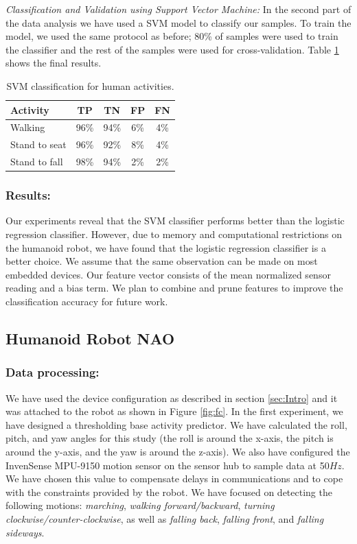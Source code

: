 \documentclass[letterpaper]{article}
\begin{document}
\noindent\emph{Classification and Validation using Support Vector Machine:}
In the second part of the data analysis we have used a SVM model
to classify our samples. To train the model, we used the same protocol as before; 80\% of
samples were used to train the classifier and the rest of the  samples were used for 
cross-validation. Table \ref{tab:human-svm-class} shows the final results.

\begin{table}[!ht]
\caption{SVM classification for human activities.}
	\label{tab:human-svm-class}
	\centering
		\begin{tabular} {|l |c |c |c|c|}
			\hline
			{\bf Activity} & {\bf  TP}  &	{\bf TN}  &	{\bf FP} &	{\bf FN} \\ 
			\hline
			Walking	& 96\%	& 94\%	& 6\%	& 4\% \\ \hline
			Stand to seat	& 96\%	& 92\%	& 8\% & 	4\%	 \\ \hline 
			Stand to fall	& 98\%	& 94\%	& 2\%	& 2\%	 \\ \hline
		\end{tabular}
\end{table}

\subsubsection{Results:}
Our experiments reveal that the SVM classifier performs better than the logistic regression classifier. 
However, due to memory and computational restrictions on the humanoid robot, we have found that the logistic 
regression classifier is a better choice. We assume that the same observation can be made on most embedded 
devices. Our feature vector consists of the mean normalized sensor reading and a bias term. We plan to 
combine and prune features to improve the classification accuracy for future work.  


\subsection{Humanoid Robot NAO}
\subsubsection{Data processing:} 
We have used the device configuration as described in section \ref{sec:Intro}
and it was attached to the robot as shown in Figure \ref{fig:fc}. In the first experiment, we have 
designed a thresholding base activity predictor. We have calculated the roll, pitch, and yaw angles 
for this study (the roll is around the x-axis, the pitch is around the y-axis, and the yaw is around 
the z-axis). We also have configured the InvenSense MPU-9150 motion sensor on the sensor hub to 
sample data at 50$Hz$. We have chosen this value to compensate delays in communications and to cope 
with the constraints provided by the robot. We have focused on detecting the following motions: \textit{marching}, \textit{walking forward/backward}, \textit{turning clockwise/counter-clockwise},
as well as \textit{falling back}, \textit{falling front}, and \textit{falling sideways}.
\end{document}
